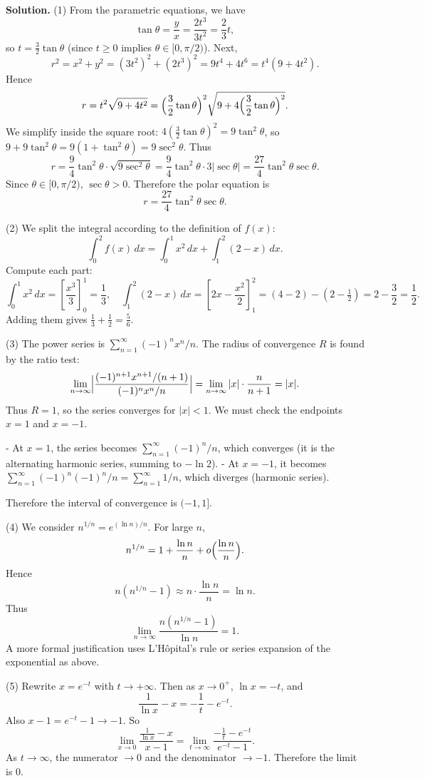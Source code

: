 \documentclass[12pt, a4paper, oneside]{article}
\newenvironment{solution}
  {\par\noindent\textbf{Solution. }\newline}
  {\par}
\begin{document}
\begin{solution}
(1) From the parametric equations, we have 
\[
\tan\theta = \frac{y}{x} = \frac{2t^3}{3t^2} = \frac{2}{3}t,
\]
so \(t = \tfrac{3}{2}\tan\theta\) (since \(t\ge 0\) implies \(\theta\in [0,\pi/2)\)). Next, 
\[
r^2 = x^2 + y^2 = (3t^2)^2 + (2t^3)^2 = 9t^4 + 4t^6 = t^4(9 + 4t^2).
\]
Hence 
\[
r = t^2\sqrt{9 + 4t^2} = \Bigl(\frac{3}{2}\tan\theta\Bigr)^2\sqrt{9 + 4\Bigl(\frac{3}{2}\tan\theta\Bigr)^2}.
\]
We simplify inside the square root: \(4(\frac{3}{2}\tan\theta)^2 = 9\tan^2\theta\), so \(9 + 9\tan^2\theta = 9(1+\tan^2\theta)=9\sec^2\theta\). Thus 
\[
r = \frac{9}{4}\tan^2\theta \cdot \sqrt{9\sec^2\theta} 
= \frac{9}{4}\tan^2\theta \cdot 3|\sec\theta| = \frac{27}{4}\tan^2\theta\sec\theta.
\]
Since \(\theta\in[0,\pi/2)\), \(\sec\theta>0\). Therefore the polar equation is 
\[
r = \frac{27}{4} \tan^2\theta \sec\theta.
\]

(2) We split the integral according to the definition of \(f(x)\):
\[
\int_{0}^{2} f(x)\,dx = \int_{0}^{1} x^2\,dx + \int_{1}^{2} (2-x)\,dx.
\]
Compute each part:
\[
\int_{0}^{1} x^2\,dx = \left[\frac{x^3}{3}\right]_{0}^{1} = \frac{1}{3},
\quad
\int_{1}^{2} (2-x)\,dx = \left[2x - \frac{x^2}{2}\right]_{1}^{2} = (4 - 2) - (2 - \tfrac{1}{2}) = 2 - \frac{3}{2} = \frac{1}{2}.
\]
Adding them gives \(\frac{1}{3} + \frac{1}{2} = \frac{5}{6}\). 

(3) The power series is \(\sum_{n=1}^{\infty}(-1)^n x^n / n\). The radius of convergence \(R\) is found by the ratio test: 
\[
\lim_{n\to\infty} \Bigl|\frac{(-1)^{n+1}x^{n+1}/(n+1)}{(-1)^n x^n/n}\Bigr| 
= \lim_{n\to\infty} |x|\cdot\frac{n}{n+1} = |x|.
\]
Thus \(R = 1\), so the series converges for \(|x|<1\). We must check the endpoints \(x=1\) and \(x=-1\). 

- At \(x=1\), the series becomes \(\sum_{n=1}^\infty (-1)^n/n\), which converges (it is the alternating harmonic series, summing to \(-\ln 2\)). 
- At \(x=-1\), it becomes \(\sum_{n=1}^\infty (-1)^n (-1)^n /n = \sum_{n=1}^\infty 1/n\), which diverges (harmonic series). 

Therefore the interval of convergence is \((-1,1]\). 

(4) We consider \(n^{1/n} = e^{(\ln n)/n}\). For large \(n\), 
\[
n^{1/n} = 1 + \frac{\ln n}{n} + o\Bigl(\frac{\ln n}{n}\Bigr).
\]
Hence 
\[
n(n^{1/n}-1) \approx n\cdot \frac{\ln n}{n} = \ln n.
\]
Thus 
\[
\lim_{n\to\infty} \frac{n(n^{1/n}-1)}{\ln n} = 1.
\]
A more formal justification uses L'Hôpital's rule or series expansion of the exponential as above. 

(5) Rewrite \(x = e^{-t}\) with \(t\to +\infty\). Then as \(x\to 0^+\), \(\ln x = -t\), and 
\[
\frac{1}{\ln x} - x = -\frac{1}{t} - e^{-t}.
\]
Also \(x-1 = e^{-t} - 1 \to -1\). So 
\[
\lim_{x\to 0} \frac{\frac{1}{\ln x} - x}{x-1} 
= \lim_{t\to\infty} \frac{-\frac{1}{t} - e^{-t}}{e^{-t}-1}.
\]
As \(t\to\infty\), the numerator \(\to 0\) and the denominator \(\to -1\). Therefore the limit is \(0\). 
\end{solution}
\end{document}
